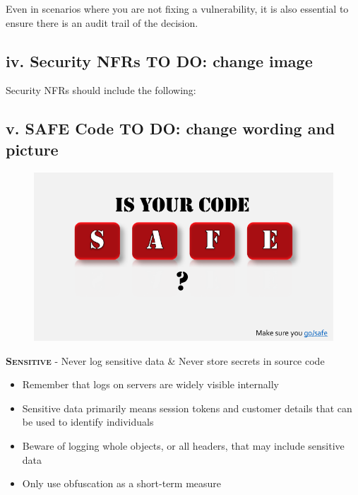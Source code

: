 \documentclass[a5paper,pagesize,10pt,bibtotoc,DIV=10,twoside]{scrbook}
\begin{document}
Even in scenarios where you are not fixing a vulnerability, it is also essential to ensure there is an audit trail of the decision.\\


\newpage
\subsection{\textbf{iv.} Security NFRs  \textbf{TO DO:} change image}

Security NFRs should include the following:


\subsection{\textbf{v.} SAFE Code  \textbf{TO DO:} change wording and picture}

\begin{figure}[H]
\includegraphics[scale=0.34]{images/safe}
\end{figure}

\newpage
\hspace*{-0.5cm}\textsc{\textbf{\textcolor{safe}{\textbf{Sensitive}} }} - Never log sensitive data \&  Never store secrets in source code 

\begin{itemize}
\item Remember that logs on servers are widely visible internally
\item Sensitive data primarily means session tokens and customer details that can be used to identify individuals
\item Beware of logging whole objects, or all headers, that may include sensitive data
\item Only use obfuscation as a short-term measure
\end{itemize}
\end{document}
